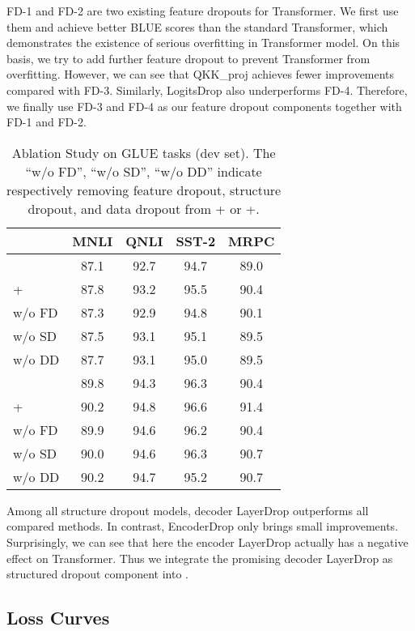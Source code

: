 \documentclass[11pt]{article}
\begin{document}
FD-1 and FD-2 are two existing feature dropouts for Transformer. We first use them and achieve better BLUE scores than the standard Transformer, which demonstrates the existence of serious overfitting in Transformer model. On this basis, we try to add further feature dropout to prevent Transformer from overfitting. However, we can see that QKK\_proj achieves fewer improvements compared with FD-3. Similarly, LogitsDrop also underperforms FD-4. Therefore, we finally use FD-3 and FD-4 as our feature dropout components together with FD-1 and FD-2.


\begin{table}[!htbp]
    \small
    \centering
	\resizebox{1.0\linewidth}{!}
	{
		\centering
		\begin{tabular}{l | c c c c}
			\hline
            & MNLI & QNLI & SST-2 & MRPC\\
			\hline
			 & 87.1 & 92.7 & 94.7 & 89.0\\
			+ & 87.8 & 93.2 & 95.5 & 90.4 \\
w/o FD & 87.3 & 92.9 & 94.8 & 90.1 \\
            w/o SD & 87.5 & 93.1 & 95.1 & 89.5 \\
            w/o DD & 87.7 & 93.1 & 95.0 & 89.5 \\
			\hline
			 & 89.8 & 94.3 & 96.3 & 90.4 \\
			+ & 90.2 & 94.8 & 96.6 & 91.4 \\
w/o FD & 89.9 & 94.6 & 96.2 & 90.4 \\
            w/o SD & 90.0 & 94.6 & 96.3 & 90.7 \\
            w/o DD & 90.2 & 94.7 & 95.2 & 90.7 \\
			\hline
	\end{tabular} }
	\caption{Ablation Study on GLUE tasks (dev set). The ``w/o FD'', ``w/o SD'', ``w/o DD'' indicate respectively removing feature dropout, structure dropout, and data dropout from + or +.} 
	\label{cls_glue_ablation}
\end{table}

Among all structure dropout models, decoder LayerDrop outperforms all compared methods. In contrast, EncoderDrop only brings small improvements. Surprisingly, we can see that here the encoder LayerDrop actually has a negative effect on Transformer. 
Thus we integrate the promising decoder LayerDrop as structured dropout component into . 




\subsection{Loss Curves}
\label{sec:appendix_loss_curves}
\end{document}
